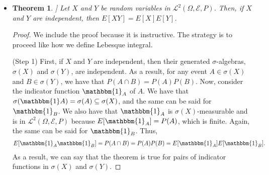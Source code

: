 \documentclass[10pt]{article}
\newtheorem{theorem}[lemma]{Theorem}
\newtheorem{definition}[lemma]{Definition}
\numberwithin{lemma}{section}
\newcommand{\mcal}[1]{\mathcal{#1}}
\newcommand{\one}{\mathbbm{1}}
\begin{document}
\begin{itemize}
\begin{comment}
  \item \begin{definition}[tail $\sigma$-algebra]
    Let $X_1$, $X_2$, $X_3$, $\dotsc$ be a sequence of random variables. For each $n$, let $\mcal{E}_n = \sigma(X_n)$ be the $\sigma$-algebra generated by $X_n$. The {\bf tail $\sigma$-algebra of the sequence} is defined to be
    \begin{align*}
      \mcal{E}_\infty = \bigcap_{n=1}^\infty \sigma\bigg( \bigcup_{m = n}^\infty \mcal{E}_m \bigg).
    \end{align*}
  \end{definition}
  The tail $\sigma$-algebra contains {\bf tail events}. A tail event is an event that do not appear in only a finite number of $\sigma$-algebras in the sequence.

  \item \begin{theorem}[Kolmogorov's zero-one law]
    Let $X_1$, $X_2$, $X_3$, $\dotsc$ be a sequence of independent random variables. Let $\mcal{E}_\infty$ be the associated tail $\sigma$-algebra. Then, if $E \in \mcal{E}_\infty$, then $P(E) = 0$ or $P(E) = 1$.
  \end{theorem}
\end{comment}

  \item \begin{theorem}]
    Let $X$ and $Y$ be random variables in $\mcal{L}^2(\Omega, \mcal{E}, P)$. Then, if $X$ and $Y$ are independent, then $E[XY] = E[X]E[Y]$.
  \end{theorem}

  \begin{proof}
    We include the proof because it is instructive. The strategy is to proceed like how we define Lebesque integral. 
    
    (Step 1) First, if $X$ and $Y$ are independent, then their generated $\sigma$-algebras, $\sigma(X)$ and $\sigma(Y)$, are independent. As a result, for any event $A \in \sigma(X)$ and $B \in \sigma(Y)$, we have that $P(A \cap B) = P(A) P(B)$. Now, consider the indicator function $\one_A$ of $A$. We have that $\sigma(\one A) = \sigma(A) \subseteq \sigma(X)$, and the same can be said for $\one_B$. We also have that $\one_A$ is $\sigma(X)$-measurable and is in $\mcal{L}^2(\Omega, \mcal{E},P)$ because $E[\one_A] = P(A)$, which is finite. Again, the same can be said for $\one_B$. Thus,
    \begin{align*}
      E[\one_A \one_B] = P(A \cap B) = P(A)P(B) = E[\one_A] E[\one_B].
    \end{align*} 
    As a result, we can say that the theorem is true for pairs of indicator functions in $\sigma(X)$ and $\sigma(Y)$.


\end{proof}
\end{itemize}
\end{document}
